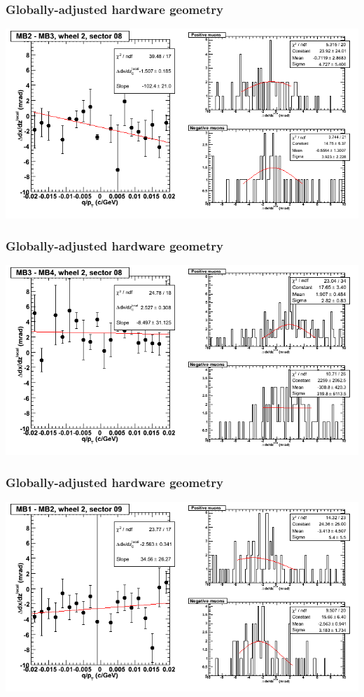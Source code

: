 \documentclass[compress]{beamer}
\begin{document}
\begin{frame}
\frametitle{Globally-adjusted hardware geometry}
\includegraphics[width=\linewidth]{NOV4_segdiffs_HW/dt13_slope_E_08_23.png}
\end{frame}

\begin{frame}
\frametitle{Globally-adjusted hardware geometry}
\includegraphics[width=\linewidth]{NOV4_segdiffs_HW/dt13_slope_E_08_34.png}
\end{frame}

\begin{frame}
\frametitle{Globally-adjusted hardware geometry}
\includegraphics[width=\linewidth]{NOV4_segdiffs_HW/dt13_slope_E_09_12.png}
\end{frame}
\end{document}
